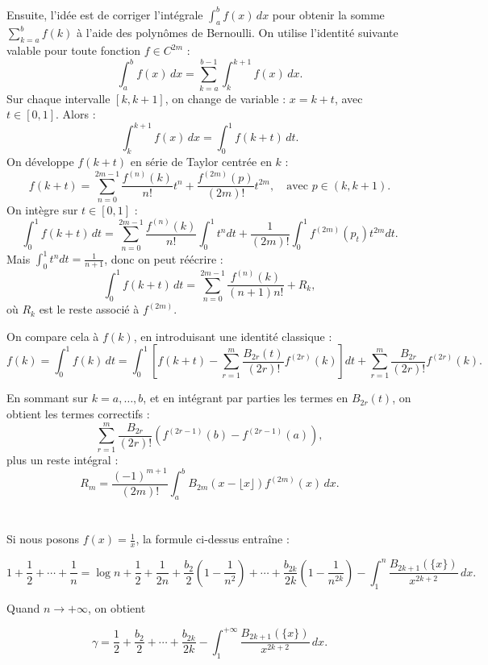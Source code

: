 \documentclass[a4paper,12pt]{article}
\begin{document}
        
        Ensuite, l’idée est de corriger l’intégrale $\int_a^b f(x)\, dx$ pour obtenir la somme $\sum_{k=a}^{b} f(k)$ à l’aide des polynômes de Bernoulli. On utilise l'identité suivante valable pour toute fonction $f \in C^{2m}$ :
        \[
        \int_a^b f(x)\, dx = \sum_{k=a}^{b-1} \int_k^{k+1} f(x)\, dx.
        \]
        Sur chaque intervalle $[k, k+1]$, on change de variable : $x = k + t$, avec $t \in [0,1]$. Alors :
        \[
        \int_k^{k+1} f(x)\, dx = \int_0^1 f(k + t)\, dt.
        \]
        On développe $f(k + t)$ en série de Taylor centrée en $k$ :
        \[
        f(k + t) = \sum_{n=0}^{2m-1} \frac{f^{(n)}(k)}{n!} t^n + \frac{f^{(2m)}(p)}{(2m)!} t^{2m}, \quad \text{avec } p \in (k, k+1).
        \]
        On intègre sur $t \in [0,1]$ :
        \[
        \int_0^1 f(k + t)\, dt = \sum_{n=0}^{2m-1} \frac{f^{(n)}(k)}{n!} \int_0^1 t^n dt + \frac{1}{(2m)!} \int_0^1 f^{(2m)}(p_t) t^{2m} dt.
        \]
        Mais $\int_0^1 t^n dt = \frac{1}{n+1}$, donc on peut réécrire :
        \[
        \int_0^1 f(k + t)\, dt = \sum_{n=0}^{2m-1} \frac{f^{(n)}(k)}{(n+1)n!} + R_k,
        \]
        où $R_k$ est le reste associé à $f^{(2m)}$.
        
        On compare cela à $f(k)$, en introduisant une identité classique :
        \[
        f(k) = \int_0^1 f(k)\, dt = \int_0^1 \left[f(k+t) - \sum_{r=1}^{m} \frac{B_{2r}(t)}{(2r)!} f^{(2r)}(k) \right] dt + \sum_{r=1}^{m} \frac{B_{2r}}{(2r)!} f^{(2r)}(k).
        \]
        
        En sommant sur $k = a, \ldots, b$, et en intégrant par parties les termes en $B_{2r}(t)$, on obtient les termes correctifs :
        \[
        \sum_{r=1}^{m} \frac{B_{2r}}{(2r)!} \left( f^{(2r-1)}(b) - f^{(2r-1)}(a) \right),
        \]
        plus un reste intégral :
        \[
        R_m = \frac{(-1)^{m+1}}{(2m)!} \int_a^b B_{2m}(x - \lfloor x \rfloor) f^{(2m)}(x) \, dx.
        \] \\\\


Si nous posons $f(x) = \frac{1}{x}$, la formule ci-dessus entraîne :

\[
1 + \frac{1}{2} + \cdots + \frac{1}{n} 
= \log n + \frac{1}{2} + \frac{1}{2n} + \frac{b_2}{2}\left(1 - \frac{1}{n^2}\right) + \cdots + \frac{b_{2k}}{2k}\left(1 - \frac{1}{n^{2k}}\right) - \int_1^n \frac{B_{2k+1}(\{x\})}{x^{2k+2}} \, dx.
\]

Quand $n \to +\infty$, on obtient

\[
\gamma = \frac{1}{2} + \frac{b_2}{2} + \cdots + \frac{b_{2k}}{2k} - \int_1^{+\infty} \frac{B_{2k+1}(\{x\})}{x^{2k+2}} \, dx.
\] \\
\end{document}

